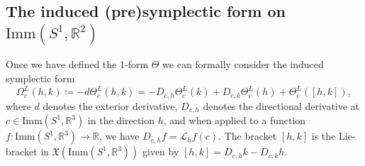 \documentclass[12pt]{amsart}
\theoremstyle{definition}
\newcommand{\R}{\mathbb R}
\newcommand{\Imm}{\mathrm{Imm}}
\def\X{{\mathfrak X}}
\def\L{\mathcal{L}}
\def\R{{\mathbb R}}
\begin{document}
\subsection*{The induced (pre)symplectic form on $\Imm(S^1,\mathbb R^2)$}
Once we have defined the 1-form $\Theta$ we can formally consider the induced symplectic form
\begin{equation}\label{eq:definition_of_Omega}
\Omega^L_c(h,k)\coloneqq -d\Theta^L_c(h,k)=-D_{c,h}\Theta^L_c(k)+D_{c,k}\Theta^L_c(h)+\Theta^L_c([h,k]),
\end{equation}
where $d$ denotes the exterior derivative, $D_{c,h}$ denotes the directional derivative at  $c\in \Imm(S^1,\R^3)$ in the direction $h$, and when applied to a function $f\colon \Imm(S^1,\R^3)\to \R$, we have $D_{c,h}f=\L_h f (c)$. The bracket $[h,k]$ is the Lie-bracket in $\X(\Imm(S^1,\mathbb R^3))$ given by  $[h,k]=D_{c,h}k-D_{c,k}h$.
\end{document}
